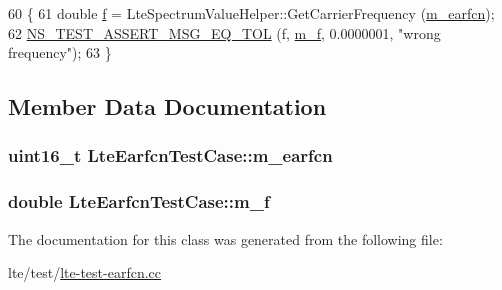 \begin{DoxyCode}
60 \{
61   \textcolor{keywordtype}{double} \hyperlink{buildings__pathloss_8m_aa52d3a6e3de5a80a97c12364caeaa125}{f} = LteSpectrumValueHelper::GetCarrierFrequency (\hyperlink{classLteEarfcnTestCase_ab4fea55308ce0ef622597e722b19d005}{m\_earfcn});
62   \hyperlink{group__testing_ga9e7861b56b4e70db3b56044cb7a28e41}{NS\_TEST\_ASSERT\_MSG\_EQ\_TOL} (f, \hyperlink{classLteEarfcnTestCase_a98327c6792af6dd6d3eb5ed3772b0960}{m\_f}, 0.0000001, \textcolor{stringliteral}{"wrong frequency"});
63 \}
\end{DoxyCode}


\subsection{Member Data Documentation}
\subsubsection[{\texorpdfstring{m\+\_\+earfcn}{m_earfcn}}]{\setlength{\rightskip}{0pt plus 5cm}uint16\+\_\+t Lte\+Earfcn\+Test\+Case\+::m\+\_\+earfcn\hspace{0.3cm}{\ttfamily [protected]}}\hypertarget{classLteEarfcnTestCase_ab4fea55308ce0ef622597e722b19d005}{}\label{classLteEarfcnTestCase_ab4fea55308ce0ef622597e722b19d005}
\subsubsection[{\texorpdfstring{m\+\_\+f}{m_f}}]{\setlength{\rightskip}{0pt plus 5cm}double Lte\+Earfcn\+Test\+Case\+::m\+\_\+f\hspace{0.3cm}{\ttfamily [protected]}}\hypertarget{classLteEarfcnTestCase_a98327c6792af6dd6d3eb5ed3772b0960}{}\label{classLteEarfcnTestCase_a98327c6792af6dd6d3eb5ed3772b0960}


The documentation for this class was generated from the following file\+:\begin{DoxyCompactItemize}
\item 
lte/test/\hyperlink{lte-test-earfcn_8cc}{lte-\/test-\/earfcn.\+cc}\end{DoxyCompactItemize}

